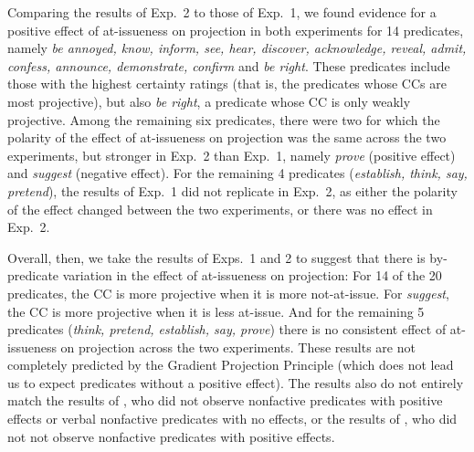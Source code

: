 \documentclass[11pt,fleqn]{article}
\newcommand{\6}{\mbox{$[\hspace*{-.6mm}[$}}
\newcommand{\9}{\mbox{$]\hspace*{-.6mm}]$}}
\begin{document}
Comparing the results of Exp.~2 to those of Exp.~1, we found evidence for a positive effect of at-issueness on projection in both experiments for 14 predicates, namely {\em be annoyed, know, inform, see, hear, discover, acknowledge, reveal, admit, confess, announce, demonstrate, confirm} and {\em be right}. These predicates include those with the highest certainty ratings (that is, the predicates whose CCs are most projective), but also \emph{be right}, a predicate whose CC is only weakly projective. Among the remaining six predicates, there were two for which the polarity of the effect of at-issueness on projection was the same across the two experiments, but stronger in Exp.~2 than Exp.~1, namely {\em prove} (positive effect) and {\em suggest} (negative effect). For the remaining 4 predicates ({\em establish, think, say, pretend}), the results of Exp.~1 did not replicate in Exp.~2, as either the polarity of the effect changed between the two experiments, or there was no effect in Exp.~2. 

Overall, then, we take the results of Exps.~1 and 2 to suggest that there is by-predicate variation in the effect of at-issueness on projection: For 14 of the 20 predicates, the CC is more projective when it is more not-at-issue. For {\em suggest}, the CC is more projective when it is less at-issue. And for the remaining 5 predicates (\emph{think, pretend, establish, say, prove}) there is no consistent effect of at-issueness on projection across the two experiments. These results  are not completely predicted by the Gradient Projection Principle (which does not lead us to expect predicates without a positive effect). The results also do not entirely match the results of \citealt{djaerv-bacovcin-salt27,djaerv-bacovcin2020}, who did not observe nonfactive predicates with positive effects or verbal nonfactive predicates with no effects, or the results of \citealt{mahler-etal2020}, who did not not observe nonfactive predicates with positive effects.
\end{document}
